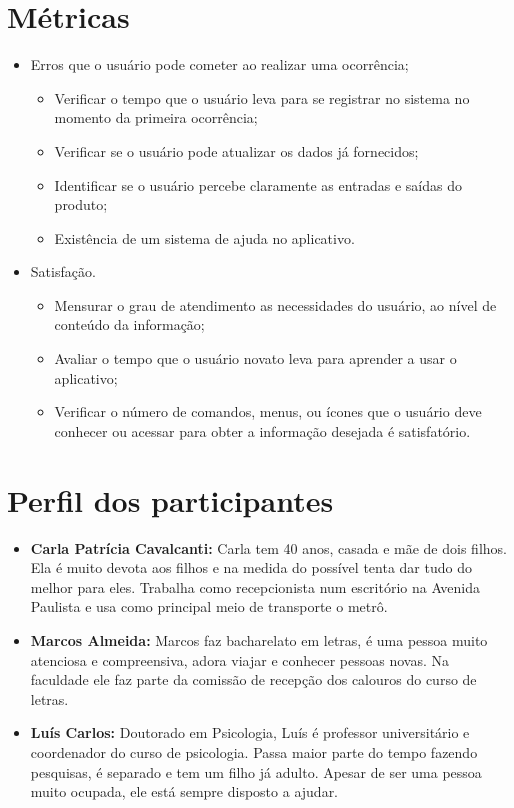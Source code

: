\documentclass[a4paper,12pt,twoside]{report}
\begin{document}
\section{Métricas}
\begin{itemize}
\item Erros que o usuário pode cometer ao realizar uma ocorrência;
\begin{itemize}
\item Verificar o tempo que o usuário leva para se registrar no sistema no momento da primeira ocorrência;
\item Verificar se o usuário pode atualizar os dados já fornecidos;
\item Identificar se o usuário percebe claramente as entradas e saídas do produto;
\item Existência de um sistema de ajuda no aplicativo.
\end{itemize}
\item Satisfação.
\begin{itemize}
\item Mensurar o grau de atendimento as necessidades do usuário, ao nível de conteúdo da informação;
\item Avaliar o tempo que o usuário novato leva para aprender a usar o aplicativo;
\item Verificar o número de comandos, menus, ou ícones que o usuário deve conhecer ou acessar para obter a informação desejada é satisfatório.
\end{itemize}
\end{itemize}

\section{Perfil dos participantes}
\begin{itemize}
\item \textbf{Carla Patrícia Cavalcanti:} Carla tem 40 anos, casada e mãe de dois filhos. Ela é muito devota aos filhos e na medida do possível tenta dar tudo do melhor para eles. Trabalha como recepcionista num escritório na Avenida Paulista e usa como principal meio de transporte o metrô. 
\item \textbf{Marcos Almeida:} Marcos faz bacharelato em letras, é uma pessoa muito atenciosa e compreensiva, adora viajar e conhecer pessoas novas. Na faculdade ele faz parte da comissão de recepção dos calouros do curso de letras.
\item \textbf{Luís Carlos:} Doutorado em Psicologia, Luís é professor universitário e coordenador do curso de psicologia. Passa maior parte do tempo fazendo pesquisas, é separado e tem um filho já adulto. Apesar de ser uma pessoa muito ocupada, ele está sempre disposto a ajudar.
\end{itemize}
\end{document}
